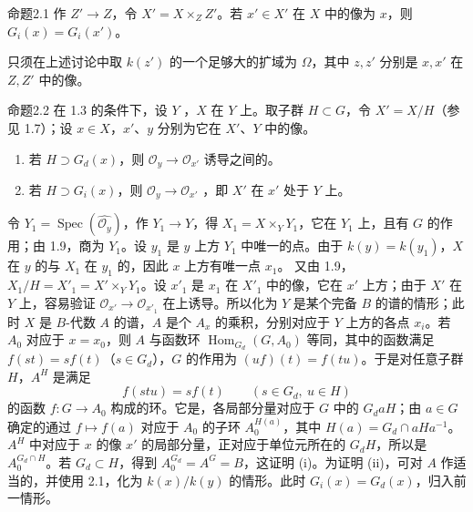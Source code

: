 \begin{SGAresult}{命题}{2.1}
作 $Z'\to Z$，令 $X'=X\times_ZZ'$。若 $x'\in X'$ 在 $X$ 中的像为 $x$，则 $G_i(x)=G_i(x')$。
\end{SGAresult}
只须在上述讨论中取 $k(z')$ 的一个足够大的扩域为 $\Omega$，其中 $z,z'$ 分别是 $x,x'$ 在 $Z,Z'$ 中的像。
\begin{SGAresult}{命题}{2.2}
在 1.3 的条件下，设 $Y$ ，$X$ 在 $Y$ 上。取子群 $H\subset G$，令 $X'=X/H$（参见 1.7）；设 $x\in X$，$x'$、$y$ 分别为它在 $X'$、$Y$ 中的像。
\begin{enumerate}
\item[(i)] 若 $H\supset G_d(x)$，则 $\mathcal O_y\to\mathcal O_{x'}$ 诱导之间的。
\item[(ii)] 若 $H\supset G_i(x)$，则 $\mathcal O_y\to\mathcal O_{x'}$ ，即 $X'$ 在 $x'$ 处于 $Y$ 上。
\end{enumerate}
\end{SGAresult}
令 $Y_1=\operatorname{Spec}(\widehat{\mathcal O_y})$，作 $Y_1\to Y$，得 $X_1=X\times_YY_1$，它在 $Y_1$ 上，且有 $G$ 的作用；由 1.9，商为 $Y_1$。设 $y_1$ 是 $y$ 上方 $Y_1$ 中唯一的点。由于 $k(y)=k(y_1)$，$X$ 在 $y$ 的与 $X_1$ 在 $y_1$ 的，因此 $x$ 上方有唯一点 $x_1$。
又由 1.9，$X_1/H=X'_1=X'\times_YY_1$。设 $x'_1$ 是 $x_1$ 在 $X'_1$ 中的像，它在 $x'$ 上方；由于 $X'$ 在 $Y$ 上，容易验证 $\mathcal O_{x'}\to\mathcal O_{x'_1}$ 在上诱导。所以化为 $Y$ 是某个完备 $B$ 的谱的情形；此时 $X$ 是 $B$-代数 $A$ 的谱，$A$ 是个 $A_x$ 的乘积，分别对应于 $Y$ 上方的各点 $x_i$。若 $A_0$ 对应于 $x=x_0$，则 $A$ 与函数环 $\operatorname{Hom}_{G_d}(G,A_0)$ 等同，其中的函数满足 $f(st)=sf(t)$（$s\in G_d$），$G$ 的作用为 $(uf)(t)=f(tu)$。于是对任意子群 $H$，$A^H$ 是满足
\[f(stu)=sf(t)\qquad(s\in G_d,\ u\in H)\]
的函数 $f:G\to A_0$ 构成的环。它是，各局部分量对应于 $G$ 中的 $G_daH$；由 $a\in G$ 确定的通过 $f\mapsto f(a)$ 对应于 $A_0$ 的子环 $A_0^{H(a)}$，其中 $H(a)=G_d\cap aHa^{-1}$。$A^H$ 中对应于 $x$ 的像 $x'$ 的局部分量，正对应于单位元所在的 $G_dH$，所以是 $A_0^{G_d\cap H}$。若 $G_d\subset H$，得到 $A_0^{G_d}=A^G=B$，这证明 (i)。为证明 (ii)，可对 $A$ 作适当的，并使用 2.1，化为 $k(x)/k(y)$ 的情形。此时 $G_i(x)=G_d(x)$，归入前一情形。
